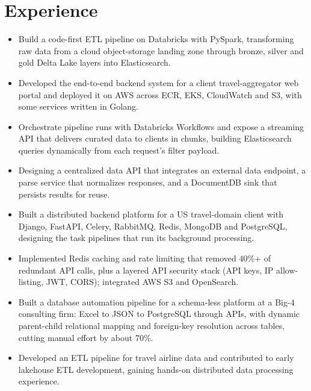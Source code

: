 \documentclass[10pt,a4paper]{article}
\begin{document}
\section{Experience}
\begin{itemize}
  \item Build a code-first ETL pipeline on Databricks with PySpark, transforming raw data from a cloud object-storage landing zone through bronze, silver and gold Delta Lake layers into Elasticsearch.
  \item Developed the end-to-end backend system for a client travel-aggregator web portal and deployed it on AWS across ECR, EKS, CloudWatch and S3, with some services written in Golang.
  \item Orchestrate pipeline runs with Databricks Workflows and expose a streaming API that delivers curated data to clients in chunks, building Elasticsearch queries dynamically from each request's filter payload.
  \item Designing a centralized data API that integrates an external data endpoint, a parse service that normalizes responses, and a DocumentDB sink that persists results for reuse.
\end{itemize}

\begin{itemize}
  \item Built a distributed backend platform for a US travel-domain client with Django, FastAPI, Celery, RabbitMQ, Redis, MongoDB and PostgreSQL, designing the task pipelines that run its background processing.
  \item Implemented Redis caching and rate limiting that removed 40\%+ of redundant API calls, plus a layered API security stack (API keys, IP allow-listing, JWT, CORS); integrated AWS S3 and OpenSearch.
  \item Built a database automation pipeline for a schema-less platform at a Big-4 consulting firm: Excel to JSON to PostgreSQL through APIs, with dynamic parent-child relational mapping and foreign-key resolution across tables, cutting manual effort by about 70\%.
  \item Developed an ETL pipeline for travel airline data and contributed to early lakehouse ETL development, gaining hands-on distributed data processing experience.
\end{itemize}
\end{document}
